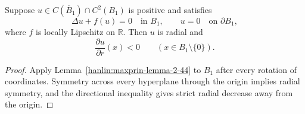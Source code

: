 \begin{theorem}\label{hanlin:maxprin-theorem-2-43}
Suppose $u\in C(\overline B_1)\cap C^2(B_1)$ is positive and satisfies
\[
\Delta u+f(u)=0\quad\text{in }B_1,
\qquad
u=0\quad\text{on }\partial B_1,
\]
where $f$ is locally Lipschitz on $\mathbb R$. Then $u$ is radial and
\[
\frac{\partial u}{\partial r}(x)<0
\qquad(x\in B_1\setminus\{0\}).
\]
\end{theorem}
\begin{proof}
\sketch Apply Lemma~\ref{hanlin:maxprin-lemma-2-44} to $B_1$ after every
rotation of coordinates. Symmetry across every hyperplane through the origin
implies radial symmetry, and the directional inequality gives strict radial
decrease away from the origin.
\end{proof}

